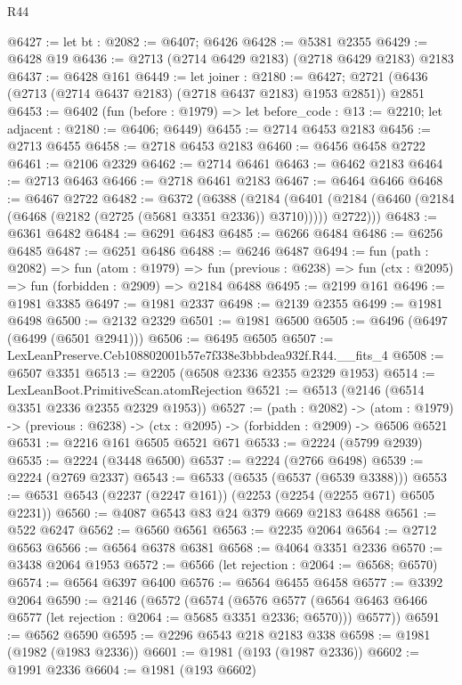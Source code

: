 \begin{lexlean}{R44}
\begin{coremodule}
@6427 := let bt : @2082 := @6407; @6426
@6428 := @5381 @2355
@6429 := @6428 @19
@6436 := @2713 (@2714 @6429 @2183) (@2718 @6429 @2183) @2183
@6437 := @6428 @161
@6449 := let joiner : @2180 := @6427;
  @2721 (@6436 (@2713 (@2714 @6437 @2183) (@2718 @6437 @2183) @1953 @2851)) @2851
@6453 := @6402
    (fun (before : @1979) => let before_code : @13 := @2210; let adjacent : @2180 := @6406; @6449)
@6455 := @2714 @6453 @2183
@6456 := @2713 @6455
@6458 := @2718 @6453 @2183
@6460 := @6456 @6458 @2722
@6461 := @2106 @2329
@6462 := @2714 @6461
@6463 := @6462 @2183
@6464 := @2713 @6463
@6466 := @2718 @6461 @2183
@6467 := @6464 @6466
@6468 := @6467 @2722
@6482 := @6372
    (@6388
      (@2184
        (@6401 (@2184 (@6460 (@2184 (@6468 (@2182 (@2725 (@5681 @3351 @2336)) @3710))))) @2722)))
@6483 := @6361 @6482
@6484 := @6291 @6483
@6485 := @6266 @6484
@6486 := @6256 @6485
@6487 := @6251 @6486
@6488 := @6246 @6487
@6494 := fun (path : @2082) =>
  fun (atom : @1979) =>
  fun (previous : @6238) => fun (ctx : @2095) => fun (forbidden : @2909) => @2184 @6488
@6495 := @2199 @161
@6496 := @1981 @3385
@6497 := @1981 @2337
@6498 := @2139 @2355
@6499 := @1981 @6498
@6500 := @2132 @2329
@6501 := @1981 @6500
@6505 := @6496 (@6497 (@6499 (@6501 @2941)))
@6506 := @6495 @6505
@6507 := LexLeanPreserve.Ceb108802001b57e7f338e3bbbdea932f.R44.__fits_4
@6508 := @6507 @3351
@6513 := @2205 (@6508 @2336 @2355 @2329 @1953)
@6514 := LexLeanBoot.PrimitiveScan.atomRejection
@6521 := @6513 (@2146 (@6514 @3351 @2336 @2355 @2329 @1953))
@6527 := (path : @2082) ->
  (atom : @1979) -> (previous : @6238) -> (ctx : @2095) -> (forbidden : @2909) -> @6506 @6521
@6531 := @2216 @161 @6505 @6521 @671
@6533 := @2224 (@5799 @2939)
@6535 := @2224 (@3448 @6500)
@6537 := @2224 (@2766 @6498)
@6539 := @2224 (@2769 @2337)
@6543 := @6533 (@6535 (@6537 (@6539 @3388)))
@6553 := @6531 @6543 (@2237 (@2247 @161)) (@2253 (@2254 (@2255 @671) @6505 @2231))
@6560 := @4087 @6543 @83 @24 @379 @669 @2183 @6488
@6561 := @522 @6247
@6562 := @6560 @6561
@6563 := @2235 @2064
@6564 := @2712 @6563
@6566 := @6564 @6378 @6381
@6568 := @4064 @3351 @2336
@6570 := @3438 @2064 @1953
@6572 := @6566 (let rejection : @2064 := @6568; @6570)
@6574 := @6564 @6397 @6400
@6576 := @6564 @6455 @6458
@6577 := @3392 @2064
@6590 := @2146
    (@6572
      (@6574
        (@6576 @6577 (@6564 @6463 @6466 @6577 (let rejection : @2064 := @5685 @3351 @2336; @6570)))
        @6577))
@6591 := @6562 @6590
@6595 := @2296 @6543 @218 @2183 @338
@6598 := @1981 (@1982 (@1983 @2336))
@6601 := @1981 (@193 (@1987 @2336))
@6602 := @1991 @2336
@6604 := @1981 (@193 @6602)

\end{coremodule}
\end{lexlean}
